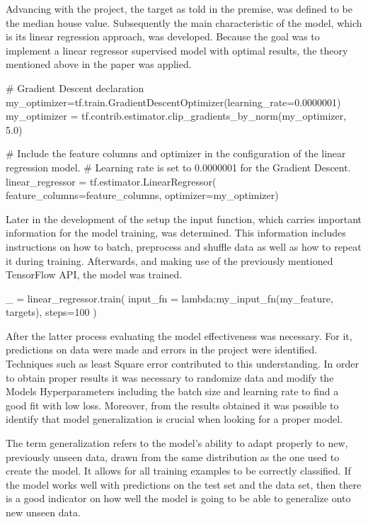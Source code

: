 Advancing with the project, the target as told in the premise, was defined to be the median house value.  Subsequently the main characteristic of the model,  which is its linear regression approach,  was developed. Because the goal was to implement a linear regressor supervised model with optimal results, the theory mentioned above in the paper was applied.

\begin{tensorflow}[caption={ads}]
# Gradient Descent declaration
my_optimizer=tf.train.GradientDescentOptimizer(learning_rate=0.0000001)
my_optimizer = tf.contrib.estimator.clip_gradients_by_norm(my_optimizer, 5.0)

# Include the feature columns and optimizer in the configuration of the  linear regression model.
# Learning rate is set to  0.0000001 for the Gradient Descent.
linear_regressor = tf.estimator.LinearRegressor( feature_columns=feature_columns, optimizer=my_optimizer)
\end{tensorflow}

Later in the development of the setup the input function, which carries important information for the model training, was determined. This information includes instructions on how to batch, preprocess and shuffle data as well as how to repeat it during training. Afterwards, and making use of the previously mentioned TensorFlow API, the model was trained.

\begin{tensorflow}[caption={ads}]
_ = linear_regressor.train(
    input_fn = lambda:my_input_fn(my_feature, targets),
    steps=100
)
\end{tensorflow}

After the latter process evaluating the model effectiveness was necessary. For it, predictions on data were made and errors in the project were identified. Techniques such as least Square error contributed to this understanding.  In order to obtain proper results it was necessary to randomize data and modify the Models Hyperparameters including the batch size and learning rate to find a good fit with low loss. Moreover, from the results obtained it was possible to identify that model generalization is crucial when looking for a proper model. 

The term generalization refers to the model’s ability to adapt properly to new, previously unseen data, drawn from the same distribution as the one used to create the model.  It allows for all training examples to be correctly classified. If the model works well with predictions on the test set and the data set, then there is a good indicator on how well the model is going to be able to generalize onto new unseen data.  

